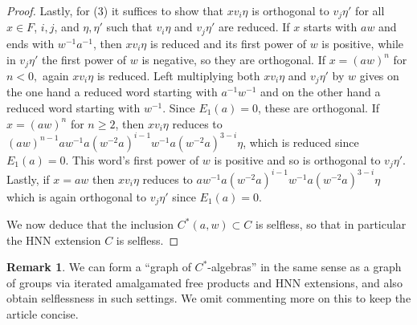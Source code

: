 \documentclass{amsart}
\theoremstyle{definition}
\newtheorem{remark}[theorem]{Remark}
\begin{document}
\begin{proof}
    Lastly, for (3) it suffices to show that $xv_i\eta$ is orthogonal to $v_j\eta'$ for all $x\in F$, $i,j$, and $\eta,\eta'$ such that $v_i\eta$ and $v_j\eta'$ are reduced. If $x$ starts with $aw$ and ends with $w^{-1}a^{-1}$, then $xv_i\eta$ is reduced and its first power of $w$ is positive, while in $v_j\eta'$ the first power of $w$ is negative, so they are orthogonal. If $x = (aw)^n$ for $n<0,$ again $xv_i\eta$ is reduced. Left multiplying both $xv_i\eta$ and $v_j\eta'$ by $w$ gives on the one hand a reduced word starting with $a^{-1}w^{-1}$ and on the other hand a reduced word starting with $w^{-1}$. Since $E_{1}(a) = 0$, these are orthogonal. If $x = (aw)^n$ for $n\ge2$, then $xv_i\eta$ reduces to $(aw)^{n-1}aw^{-1}a(w^{-2}a)^{i-1}w^{-1}a(w^{-2}a)^{3-i}\eta$, which is reduced since $E_1(a) = 0$. This word's first power of $w$ is positive and so is orthogonal to $v_j\eta'$. Lastly, if $x = aw$ then $xv_i\eta$ reduces to $aw^{-1}a(w^{-2}a)^{i-1}w^{-1}a(w^{-2}a)^{3-i}\eta$ which is again orthogonal to $v_j\eta'$ since $E_1(a)=0.$

    We now deduce that the inclusion $C^*(a,w)\subset C$ is selfless, so that in particular the HNN extension $C$ is selfless.
\end{proof}

\begin{remark}
    We can form a ``graph of $C^*$-algebras'' in the same sense as a graph of groups \cite{Ser80} via iterated amalgamated free products and HNN extensions, and also obtain selflessness in such settings. We omit commenting more on this to keep the article concise. 
\end{remark}
    

		



	



	
	
	
	
	
\end{document}
